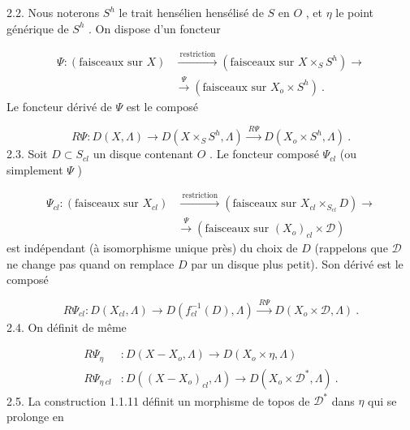 
2.2. Nous noterons $S^h$ le trait hensélien hensélisé de $S$ en $O$ , et $\eta$ le point générique de $S^h$ . On dispose d'un foncteur

\begin{equation*}
\begin{aligned}
\Psi : (\text{faisceaux sur } X) &\xrightarrow{\ \text{restriction}\ } (\text{faisceaux sur } X \times_S S^h) \longrightarrow \\
&\xrightarrow{\ \Psi\ } (\text{faisceaux sur } X_o \times S^h) \ .
\end{aligned}
\end{equation*}
Le foncteur dérivé de $\Psi$ est le composé

\begin{equation*}
R\Psi : D(X, \Lambda) \longrightarrow D(X \times_S S^h, \Lambda) \xrightarrow{\ R\Psi\ } D(X_o \times S^h, \Lambda) \ .
\end{equation*}
2.3. Soit $D \subset S_{cl}$ un disque contenant $O$ . Le foncteur composé $\Psi_{cl}$ (ou simplement $\Psi$ )

\begin{equation*}
\begin{aligned}
\Psi_{cl} : (\text{faisceaux sur } X_{cl}) &\xrightarrow{\ \text{restriction}\ } (\text{faisceaux sur } X_{cl} \times_{S_{cl}} D) \longrightarrow \\
&\xrightarrow{\ \Psi\ } (\text{faisceaux sur } (X_o)_{cl} \times \mathcal{D})
\end{aligned}
\end{equation*}
est indépendant (à isomorphisme unique près) du choix de $D$ (rappelons que $\mathcal{D}$ ne change pas quand on remplace $D$ par un disque plus petit). Son dérivé est le composé

\begin{equation*}
R\Psi_{cl} : D(X_{cl}, \Lambda) \longrightarrow D(f_{cl}^{-1}(D), \Lambda) \xrightarrow{\ R\Psi\ } D(X_o \times \mathcal{D}, \Lambda) \ .
\end{equation*}
2.4. On définit de même

\begin{equation*}
\begin{aligned}
R\Psi_{\eta} &: D(X-X_o, \Lambda) \longrightarrow D(X_o \times \eta, \Lambda) \\
R\Psi_{\eta\ cl} &: D((X-X_o)_{cl}, \Lambda) \longrightarrow D(X_o \times \mathcal{D}^*, \Lambda) \ .
\end{aligned}
\end{equation*}
2.5. La construction 1.1.11 définit un morphisme de topos de $\mathcal{D}^*$ dans $\eta$ qui se prolonge en

